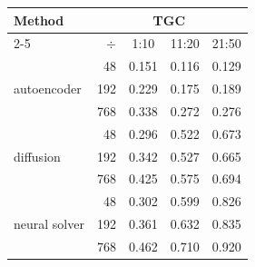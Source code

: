 \begin{subappendices}
\begin{table}[!h]
    \vspace{1em}

    \begin{tabular}{lrccc}
        \toprule
        \multirow[c]{2}{*}{Method} & \multicolumn{4}{c}{TGC} \\
        \cmidrule(lr){2-5}
         & $\div$ & 1:10 & 11:20 & 21:50 \\
        \midrule
        \multirow[c]{3}{*}{autoencoder}
        & 48 & 0.151 & 0.116 & 0.129 \\
        & 192 & 0.229 & 0.175 & 0.189 \\
        & 768 & 0.338 & 0.272 & 0.276 \\
        \midrule
        \multirow[c]{3}{*}{diffusion}
        & 48 & 0.296 & 0.522 & 0.673 \\
        & 192 & 0.342 & 0.527 & 0.665 \\
        & 768 & 0.425 & 0.575 & 0.694 \\
        \midrule
        \multirow[c]{4}{*}{neural solver}
        & 48 & 0.302 & 0.599 & 0.826 \\
        & 192 & 0.361 & 0.632 & 0.835 \\
        & 768 & 0.462 & 0.710 & 0.920 \\
        \bottomrule
    \end{tabular}
    \label{tab:vrmse-vs-compression}
\end{table}


\end{subappendices}

